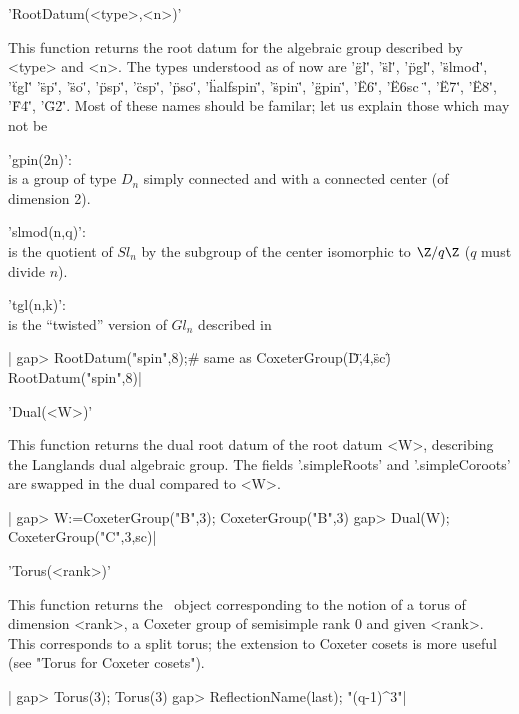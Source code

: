 
'RootDatum(<type>,<n>)'

This  function returns the root datum  for the algebraic group described by
<type>  and <n>. The  types understood as  of now are\: '\"gl\"', '\"sl\"',
'\"pgl\"', '\"slmod\"', '\"tgl\"' '\"sp\"', '\"so\"', '\"psp\"', '\"csp\"',
'\"pso\"',  '\"halfspin\"', '\"spin\"', '\"gpin\"',  '\"E6\"', '\"E6sc \"',
'\"E7\"',  '\"E8\"',  '\"F4\"',  '\"G2\"'.  Most  of  these names should be
familar; let us explain those which may not be\:

'gpin(2n)':\\ is a group of type $D_n$ simply connected and with a connected
   center (of dimension 2).

'slmod(n,q)':\\ is the quotient of $Sl_n$ by the subgroup of the center
   isomorphic to $\Z/q\Z$ ($q$ must divide $n$).

'tgl(n,k)':\\ is the ``twisted'' version of $Gl_n$ described in
   \cite[Example 5.17]{tay19}

|    gap> RootDatum("spin",8);# same as CoxeterGroup(\"D\",4,\"sc\")
    RootDatum("spin",8)|


'Dual(<W>)'

This function returns the dual root datum of the root datum <W>, describing
the   Langlands  dual  algebraic  group.   The  fields  '.simpleRoots'  and
'.simpleCoroots' are swapped in the dual compared to <W>.

|    gap> W:=CoxeterGroup("B",3);
    CoxeterGroup("B",3)
    gap> Dual(W);
    CoxeterGroup("C",3,sc)|


'Torus(<rank>)'

This  function returns the \CHEVIE\ object corresponding to the notion of a
torus  of dimension <rank>, a Coxeter group  of semisimple rank 0 and given
<rank>.  This corresponds to a split torus; the extension to Coxeter cosets
is more useful (see "Torus for Coxeter cosets").

|    gap> Torus(3);
    Torus(3)
    gap> ReflectionName(last);
    "(q-1)^3"|

